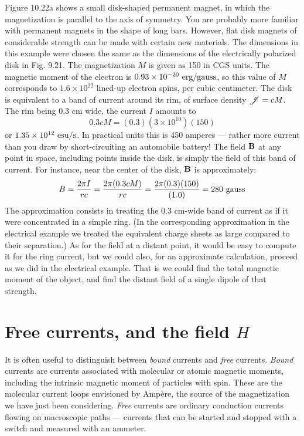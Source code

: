 Figure 10.22a shows a small disk-shaped permanent magnet, in
which the magnetization is parallel to the axis of symmetry. You
are probably more familiar with permanent magnets in the shape of
long bars. However, flat disk magnets of considerable strength can
be made with certain new materials. The dimensions in this example
were chosen the same as the dimensions of the electrically polarized
disk in Fig. 9.21. The magnetization $M$ is given as 150 in
CGS units. The magnetic moment of the electron is 
$0.93 \times 10^{-20}\ \zu{erg}/\zu{gauss}$,
so this value of $M$ corresponds to $1.6 \times 10^{22}$ lined-up
electron spins, per cubic centimeter. The disk is equivalent to a
band of current around its rim, of surface density $\mathscr{J} = cM$. The rim
being 0.3 cm wide, the current $I$ amounts to
\begin{equation}
  0.3 c M = (0.3)(3\times10^{10})(150)
\end{equation}
or $1.35 \times 10^{12}\ \zu{esu}/\sunit$. In practical units this is 450 amperes --- 
rather more current than you draw by short-circuiting an automobile
battery! The field $\mathbf{B}$ at any point in space, including points inside
the disk, is simply the field of this band of current. For instance,
near the center of the disk, $\mathbf{B}$ is approximately:
\begin{equation}
  B = \frac{2\pi I}{rc} = \frac{2\pi(0.3cM)}{rc} = \frac{2\pi(0.3)(150)}{(1.0)} = 280\ \textup{gauss}
\end{equation}
The approximation consists in treating the 0.3 cm-wide band of 
current as if it were concentrated in a simple ring. (In the corresponding
approximation in the electrical example we treated the equivalent
charge sheets as large compared to their separation.) As for
the field at a distant point, it would be easy to compute it for the
ring current, but we could also, for an approximate calculation,
proceed as we did in the electrical example. That is we could find
the total magnetic moment of the object, and find the distant field
of a single dipole of that strength.

\section{Free currents, and the field $H$}

It is often useful to distinguish between \emph{bound} currents and \emph{free}
currents.
\emph{Bound} currents are currents associated with molecular
or atomic magnetic moments, including the intrinsic magnetic
moment of particles with spin. These are the molecular current
loops envisioned by Amp\`ere, the source of the magnetization we
have just been considering. \emph{Free} currents are ordinary conduction
currents flowing on macroscopic paths --- currents that can be started
and stopped with a switch and measured with an ammeter.

